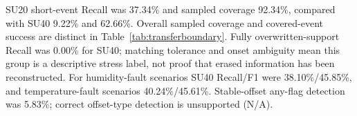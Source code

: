 SU20 short-event Recall was 37.34\% and sampled coverage 92.34\%, compared with SU40 9.22\% and 62.66\%. Overall sampled coverage and covered-event success are distinct in Table~\ref{tab:transferboundary}. Fully overwritten-support Recall was 0.00\% for SU40; matching tolerance and onset ambiguity mean this group is a descriptive stress label, not proof that erased information has been reconstructed. For humidity-fault scenarios SU40 Recall/F1 were 38.10\%/45.85\%, and temperature-fault scenarios 40.24\%/45.61\%. Stable-offset any-flag detection was 5.83\%; correct offset-type detection is unsupported (N/A).
